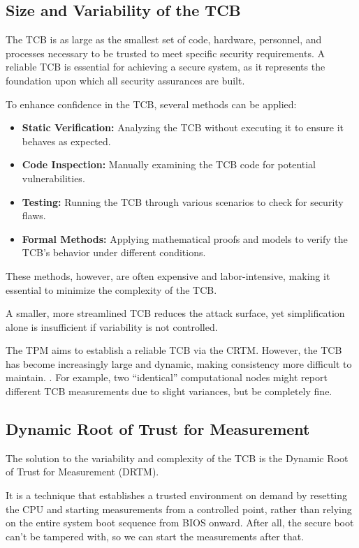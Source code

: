 \subsection{Size and Variability of the TCB}

The TCB is as large as the smallest set of code, hardware, personnel,
and processes necessary to be trusted to meet specific security
requirements. A reliable TCB is essential for achieving a secure
system, as it represents the foundation upon which all security
assurances are built.

To enhance confidence in the TCB, several methods can be applied:
\begin{itemize}
    \item \textbf{Static Verification:} Analyzing the TCB without
      executing it to ensure it behaves as expected.
    \item \textbf{Code Inspection:} Manually examining the TCB code
      for potential vulnerabilities.
    \item \textbf{Testing:} Running the TCB through various scenarios
      to check for security flaws.
    \item \textbf{Formal Methods:} Applying mathematical proofs and
      models to verify the TCB's behavior under different conditions.
\end{itemize}

These methods, however, are often expensive and labor-intensive,
making it essential to minimize the complexity of the TCB. 

\begin{boxH}
A smaller, more streamlined TCB reduces the attack surface, yet
simplification alone is insufficient if variability is not controlled.
\end{boxH}

The TPM aims to establish a reliable TCB via the CRTM. However, the
TCB has become increasingly large and dynamic, making consistency more
difficult to maintain. . For example, two “identical” computational
nodes might report different TCB measurements due to slight variances,
but be completely fine.

\subsection{Dynamic Root of Trust for Measurement}
The solution to the variability and complexity of the TCB is the 
Dynamic Root of Trust for Measurement (DRTM).

It is a technique that establishes a trusted environment on demand by
resetting the CPU and starting measurements from a controlled point,
rather than relying on the entire system boot sequence from BIOS
onward. After all, the secure boot can't be tampered with, so we can
start the measurements after that. 

